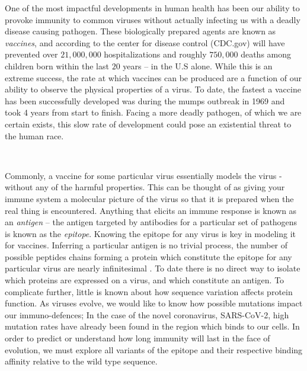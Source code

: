 \documentclass{article}
\begin{document}
One of the most impactful developments in human health has been our ability to provoke immunity to common
viruses without actually infecting us with a deadly disease causing pathogen.
These biologically prepared agents are known as \textit{vaccines}, 
and according to the center for disease control (CDC.gov) will have prevented over $21,000,000$ hospitalizations and roughly $750,000$
deaths among children born within the last $20$ years -- in the U.S alone.
While this is an extreme success, the rate at which vaccines can be produced are a function of our ability to observe the physical properties of a virus.
To date, the fastest a vaccine has been successfully developed was during the mumps outbreak in 1969 and took 4 years from start to finish.
Facing a more deadly pathogen, of which we are certain exists, this slow rate of development could pose an existential threat to the human race.

~

Commonly, a vaccine for some particular virus essentially models the virus - without any of the harmful properties.
This can be thought of as giving your immune system a molecular picture of the virus so that it is prepared when the real thing is encountered.
Anything that elicits an immune response is known as an \textit{antigen} -- the antigen targeted by antibodies for a particular set of pathogens is known as the \textit{epitope}.
Knowing the epitope for any virus is key in modeling it for vaccines.
Inferring a particular antigen is no trivial process, the number of possible peptides chains forming a protein which constitute the epitope for any particular virus are nearly infinitesimal \citep{Stoddard2020}.
To date there is no direct way to isolate which proteins are expressed on a virus, and which constitute an antigen.
To complicate further, little is known about how sequence variation affects protein function.
As viruses evolve, we would like to know how possible mutations impact our immuno-defences; 
In the case of the novel coronavirus, SARS-CoV-2, high mutation rates have already been found in the region which binds to our cells.
In order to predict or understand how long immunity will last in the face of evolution, we must explore all variants of the epitope
and their respective binding affinity relative to the wild type sequence.

~
\end{document}
